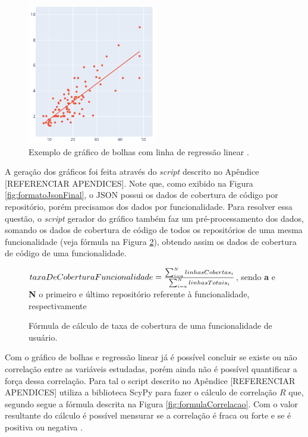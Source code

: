 \documentclass[11.5pt]{article}
\begin{document}
\begin{figure}[ht]
    \centering
    \includegraphics[width=0.5\textwidth]{linear_regression_example.png}
    \caption{Exemplo de gráfico de bolhas com linha de regressão linear \cite{plotly}.}
    \label{fig:lin_reg_example}
\end{figure}

A geração dos gráficos foi feita através do \textit{script} descrito no Apêndice [REFERENCIAR APENDICES].
Note que, como exibido na Figura \ref{fig:formatoJsonFinal}, o JSON possui os dados de cobertura de
código por repositório, porém precisamos dos dados por funcionalidade.
Para resolver essa questão, o \textit{script} gerador do gráfico também faz um pré-processamento
dos dados, somando os dados de cobertura de código de todos os repositórios de uma mesma
funcionalidade (veja fórmula na Figura \ref{fig:formulaTaxaDeCoberturaComponent}), obtendo assim os
dados de cobertura de código de uma funcionalidade.

\begin{figure}[ht]
\caption{Fórmula de cálculo de taxa de cobertura de uma funcionalidade de usuário.}
\label{fig:formulaTaxaDeCoberturaComponent}
\begin{center}
    $taxaDeCoberturaFuncionalidade = {\sum_{i=a}^{N} linhasCobertas_i \over \sum_{i=a}^{N} linhasTotais_i}$, sendo
    \textbf{a} e \textbf{N} o primeiro e último repositório referente à funcionalidade, respectivamente
\end{center}
\end{figure}

Com o gráfico de bolhas e regressão linear já é possível concluir se existe ou não correlação entre
as variáveis estudadas, porém ainda não é possível quantificar a força dessa correlação.
Para tal o script descrito no Apêndice [REFERENCIAR APENDICES] utiliza a biblioteca ScyPy
\cite{scipy} para fazer o cálculo de correlação $R$ que, segundo \cite{scipy} segue a fórmula
descrita na Figura \ref{fig:formulaCorrelacao}.
Com o valor resultante do cálculo é possível mensurar se a correlação é fraca ou forte e se é
positiva ou negativa \cite{openIntroStat}.
\end{document}
